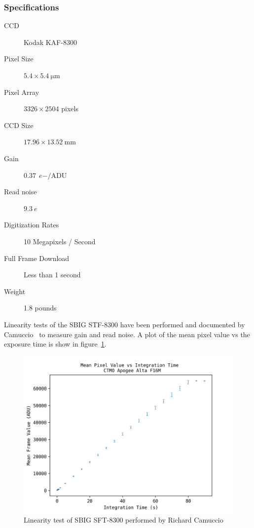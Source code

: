 \subsubsection{Specifications}
\begin{description}
    \item[CCD] Kodak KAF-8300
    \item[Pixel Size] $5.4 \times \SI{5.4}{\micro\meter}$
    \item[Pixel Array] $3326 \times 2504$ pixels
    \item[CCD Size] $17.96 \times \SI{13.52}{\milli\meter}$
    \item[Gain] $\SI{0.37}{\elementarycharge-\per\text{ADU}}$
    \item[Read noise] $\SI{9.3}{\elementarycharge}$
    \item[Digitization Rates] 10 Megapixels / Second
    \item[Full Frame Download] Less than 1 second
    \item[Weight] 1.8 pounds
\end{description}
Linearity tests of the SBIG STF-8300 have been performed and documented by Camuccio~\cite{richard_2019a} to measure gain and read noise.
A plot of the mean pixel value vs the exposure time is show in figure~\ref{fig:linearitysbig}.
\begin{figure}[h]
    \centering
    \includegraphics[width=\columnwidth]{figures/sbig_linearity.png}
    \caption{Linearity test of SBIG SFT-8300 performed by Richard Camuccio~\protect\cite{richard_2019a}}
\label{fig:linearitysbig}
\end{figure}

